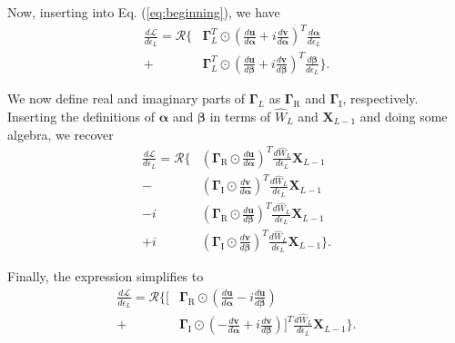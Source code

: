 Now, inserting into Eq. (\ref{eq:beginning}), we have 
\begin{align}
\frac{d\mathcal{L}}{d\epsilon_L} = \mathcal{R}\Bigg\{  &\boldsymbol{\Gamma}_L^T \odot \left( \frac{d\mathbf{u}}{d\boldsymbol{\alpha}} + i  \frac{d\mathbf{v}}{d\boldsymbol{\alpha}} \right)^T \frac{d\boldsymbol{\alpha}}{d\epsilon_L} \\
+ &\boldsymbol{\Gamma}_L^T \odot \left( \frac{d\mathbf{u}}{d\boldsymbol{\beta}} + i  \frac{d\mathbf{v}}{d\boldsymbol{\beta}} \right)^T \frac{d\boldsymbol{\beta}}{d\epsilon_L}  \Bigg\}.
\end{align}

We now define real and imaginary parts of $\boldsymbol{\Gamma}_L$ as $\boldsymbol{\Gamma}_\textrm{R}$ and $\boldsymbol{\Gamma}_\textrm{I}$, respectively.  Inserting the definitions of $\boldsymbol{\alpha}$ and $\boldsymbol{\beta}$ in terms of $\hat{W}_L$ and $\mathbf{X}_{L-1}$ and doing some algebra, we recover
\begin{align}
\frac{d\mathcal{L}}{d\epsilon_L} = \mathcal{R}\Bigg\{ &\left( \boldsymbol{\Gamma}_\textrm{R} \odot \frac{d\mathbf{u}}{d\boldsymbol{\alpha}} \right)^T \frac{d\hat{W}_L}{d\epsilon_L} \mathbf{X}_{L-1} \\
- &\left( \boldsymbol{\Gamma}_\textrm{I} \odot \frac{d\mathbf{v}}{d\boldsymbol{\alpha}} \right)^T \frac{d\hat{W}_L}{d\epsilon_L} \mathbf{X}_{L-1} \\
-i &\left( \boldsymbol{\Gamma}_\textrm{R} \odot \frac{d\mathbf{u}}{d\boldsymbol{\beta}} \right)^T \frac{d\hat{W}_L}{d\epsilon_L} \mathbf{X}_{L-1} \\
+i &\left( \boldsymbol{\Gamma}_\textrm{I} \odot \frac{d\mathbf{v}}{d\boldsymbol{\beta}} \right)^T \frac{d\hat{W}_L}{d\epsilon_L} \mathbf{X}_{L-1}
\Bigg\}.
\label{eq:final_answer}
\end{align}

Finally, the expression simplifies to 
\begin{align}
\frac{d\mathcal{L}}{d\epsilon_L} = \mathcal{R}\Bigg\{ \Bigg[ & \boldsymbol{\Gamma}_\textrm{R} \odot \left( \frac{d\mathbf{u}}{d\boldsymbol{\alpha}} - i\frac{d\mathbf{u}}{d\boldsymbol{\beta}} \right) \\
 + & \boldsymbol{\Gamma}_\textrm{I} \odot \left( -\frac{d\mathbf{v}}{d\boldsymbol{\alpha}} + i\frac{d\mathbf{v}}{d\boldsymbol{\beta}} \right)  \Bigg]^T \frac{d\hat{W}_L}{d\epsilon_L} \mathbf{X}_{L-1} \Bigg\}.
\end{align}

